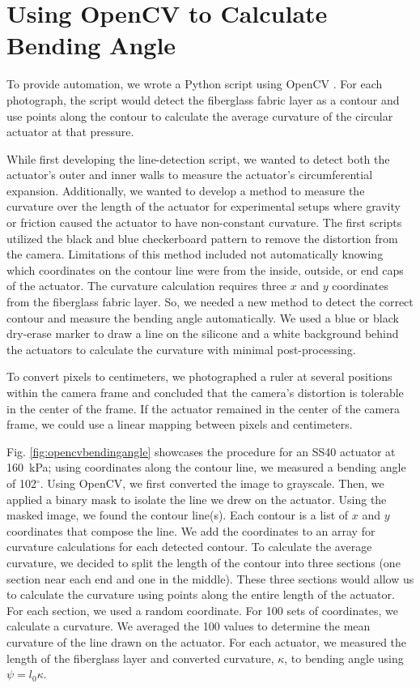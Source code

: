 \section{Using OpenCV to Calculate Bending Angle}
\label{section:opencv}

To provide automation, we wrote a Python script using OpenCV \cite{opencv_library}. For each photograph, the script would detect the fiberglass fabric layer as a contour and use points along the contour to calculate the average curvature of the circular actuator at that pressure. 

While first developing the line-detection script, we wanted to detect both the actuator's outer and inner walls to measure the actuator's circumferential expansion. Additionally, we wanted to develop a method to measure the curvature over the length of the actuator for experimental setups where gravity or friction caused the actuator to have non-constant curvature. The first scripts utilized the black and blue checkerboard pattern to remove the distortion from the camera. Limitations of this method included not automatically knowing which coordinates on the contour line were from the inside, outside, or end caps of the actuator. The curvature calculation requires three $x$ and $y$ coordinates from the fiberglass fabric layer. So, we needed a new method to detect the correct contour and measure the bending angle automatically. We used a blue or black dry-erase marker to draw a line on the silicone and a white background behind the actuators to calculate the curvature with minimal post-processing. 

To convert pixels to centimeters, we photographed a ruler at several positions within the camera frame and concluded that the camera's distortion is tolerable in the center of the frame. If the actuator remained in the center of the camera frame, we could use a linear mapping between pixels and centimeters. 

Fig. \ref{fig:opencvbendingangle} showcases the procedure for an SS40 actuator at 160~kPa; using coordinates along the contour line, we measured a bending angle of 102$^\circ$. Using OpenCV, we first converted the image to grayscale. Then, we applied a binary mask to isolate the line we drew on the actuator. Using the masked image, we found the contour line(s). Each contour is a list of $x$ and $y$ coordinates that compose the line. We add the coordinates to an array for curvature calculations for each detected contour. To calculate the average curvature, we decided to split the length of the contour into three sections (one section near each end and one in the middle). These three sections would allow us to calculate the curvature using points along the entire length of the actuator. For each section, we used a random coordinate. For 100 sets of coordinates, we calculate a curvature. We averaged the 100 values to determine the mean curvature of the line drawn on the actuator. For each actuator, we measured the length of the fiberglass layer and converted curvature, $\kappa$, to bending angle using $\psi=l_{0}\kappa$. \\

